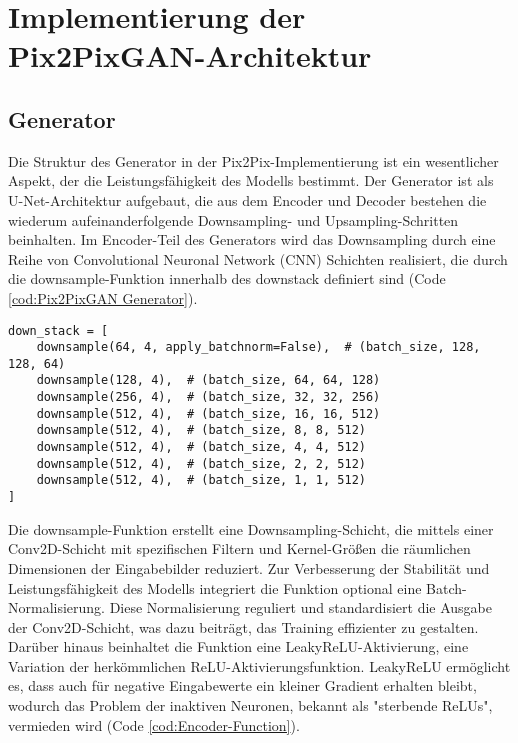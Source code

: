 \section{Implementierung der Pix2PixGAN-Architektur}
\subsection{Generator}

Die Struktur des Generator in der Pix2Pix-Implementierung ist ein wesentlicher Aspekt, der die Leistungsfähigkeit des Modells bestimmt. Der Generator ist als U-Net-Architektur aufgebaut, die aus dem Encoder und Decoder bestehen die wiederum  aufeinanderfolgende Downsampling- und Upsampling-Schritten beinhalten.
\newline
Im Encoder-Teil des Generators wird das Downsampling durch eine Reihe von Convolutional Neuronal Network (CNN) Schichten realisiert, die durch die downsample-Funktion innerhalb des downstack definiert sind (Code \ref{cod:Pix2PixGAN Generator}). 

\begin{lstlisting}[language=pyhaff, caption={Downsampling-Schritt in Pix2Pix}, 		label={cod:Encoder}]
down_stack = [
	downsample(64, 4, apply_batchnorm=False),  # (batch_size, 128, 128, 64)
	downsample(128, 4),  # (batch_size, 64, 64, 128)
	downsample(256, 4),  # (batch_size, 32, 32, 256)
	downsample(512, 4),  # (batch_size, 16, 16, 512)
	downsample(512, 4),  # (batch_size, 8, 8, 512)
	downsample(512, 4),  # (batch_size, 4, 4, 512)
	downsample(512, 4),  # (batch_size, 2, 2, 512)
	downsample(512, 4),  # (batch_size, 1, 1, 512)
]
\end{lstlisting}

Die downsample-Funktion erstellt eine Downsampling-Schicht, die mittels einer Conv2D-Schicht mit spezifischen Filtern und Kernel-Größen die räumlichen Dimensionen der Eingabebilder reduziert. Zur Verbesserung der Stabilität und Leistungsfähigkeit des Modells integriert die Funktion optional eine Batch-Normalisierung. Diese Normalisierung reguliert und standardisiert die Ausgabe der Conv2D-Schicht, was dazu beiträgt, das Training effizienter zu gestalten.
Darüber hinaus beinhaltet die Funktion eine LeakyReLU-Aktivierung, eine Variation der herkömmlichen ReLU-Aktivierungsfunktion. LeakyReLU ermöglicht es, dass auch für negative Eingabewerte ein kleiner Gradient erhalten bleibt, wodurch das Problem der inaktiven Neuronen, bekannt als "sterbende ReLUs", vermieden wird (Code \ref{cod:Encoder-Function}).

